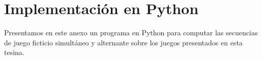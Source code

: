 \chapter{Implementación en Python}  \label{ap1}

Presentamos en este anexo un programa en Python para computar las secuencias de juego ficticio simultáneo y alternante sobre los juegos presentados en esta tesina.

\inputminted{python}{Code/anexo.py}
